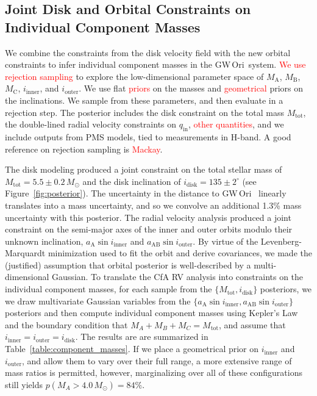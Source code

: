 \documentclass[twocolumn]{aastex61}
\newcommand{\todo}[1]{ \textcolor{red}{#1}}
\newcommand{\gw}{GW\,Ori}
\begin{document}
\subsection{Joint Disk and Orbital Constraints on Individual Component Masses} \label{sec:joint}

We combine the constraints from the disk velocity field with the new orbital constraints to infer individual component masses in the \gw\ system.
\todo{We use rejection sampling} to explore the low-dimensional parameter space of $M_\mathrm{A}$, $M_\mathrm{B}$, $M_\mathrm{C}$, $i_\mathrm{inner}$, and $i_\mathrm{outer}$. We use flat \todo{priors} on the masses and \todo{geometrical} priors on the inclinations. We sample from these parameters, and then evaluate in a rejection step. The posterior includes the disk constraint on the total mass $M_\mathrm{tot}$, the double-lined radial velocity constraints on $q_\mathrm{in}$, \todo{other quantities}, and we include outputs from PMS models, tied to measurements in H-band. A good reference on rejection sampling is \todo{Mackay}.

The disk modeling produced a joint constraint on the total stellar mass of $M_\mathrm{tot} = 5.5 \pm 0.2\, M_\odot$ and the disk inclination of $i_\mathrm{disk} = 135 \pm 2^\circ$ (see Figure~\ref{fig:posterior}). The uncertainty in the distance to \gw\ \citep[$388 \pm 5\,$pc;][]{kounkel17} linearly translates into a mass uncertainty, and so we convolve an additional 1.3\% mass uncertainty with this posterior.
The radial velocity analysis produced a joint constraint on the semi-major axes of the inner and outer orbits modulo their unknown inclination, $a_\mathrm{A} \sin i_\mathrm{inner}$ and $a_\mathrm{AB} \sin i_\mathrm{outer}$. By virtue of the Levenberg-Marquardt minimization used to fit the orbit and derive covariances, we made the (justified) assumption that orbital posterior is well-described by a multi-dimensional Gaussian.
To translate the CfA RV analysis into constraints on the individual component masses, for each sample from the $\{M_\mathrm{tot}, i_\mathrm{disk}\}$ posteriors, we we draw multivariate Gaussian variables from the $\{ a_\mathrm{A} \sin i_\mathrm{inner}, a_\mathrm{AB} \sin i_\mathrm{outer}\}$ posteriors and then compute individual component masses using Kepler's Law and the boundary condition that $M_A + M_B + M_C = M_\mathrm{tot}$, and assume that $i_\mathrm{inner} = i_\mathrm{outer} = i_\mathrm{disk}$. The results are are summarized in Table~\ref{table:component_masses}.
If we place a geometrical prior on $i_\mathrm{inner}$ and $i_\mathrm{outer}$, and allow them to vary over their full range, a more extensive range of mass ratios is permitted, however, marginalizing over all of these configurations still yields $p(M_A > 4.0\,M_\odot) = 84\%$.
\end{document}
